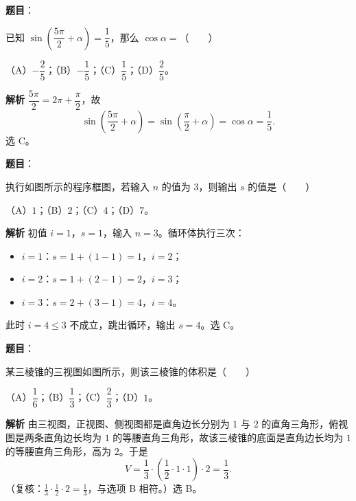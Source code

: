 \begin{answer}

\textbf{题目}：

已知 $\sin\left(\dfrac{5\pi}2+\alpha\right)=\dfrac15$，那么 $\cos\alpha=$\mbox{（　　）}

（A）$-\dfrac25$；（B）$-\dfrac15$；（C）$\dfrac15$；（D）$\dfrac25$。

\textbf{解析}
$\dfrac{5\pi}2=2\pi+\dfrac\pi2$，故
\nopagebreak[4]
\[\sin\left(\frac{5\pi}2+\alpha\right)=\sin\left(\frac\pi2+\alpha\right)=\cos\alpha=\frac15.\]
选 C。


\end{answer}
\begin{answer}

\textbf{题目}：

执行如图所示的程序框图，若输入 $n$ 的值为 $3$，则输出 $s$ 的值是\mbox{（　　）}
\nopagebreak[4]
\begin{center}\end{center}
\nopagebreak[4]
（A）$1$；（B）$2$；（C）$4$；（D）$7$。

\textbf{解析}
初值 $i=1$，$s=1$，输入 $n=3$。循环体执行三次：

\begin{itemize}
\item $i=1$：$s=1+(1-1)=1$，$i=2$；
\item $i=2$：$s=1+(2-1)=2$，$i=3$；
\item $i=3$：$s=2+(3-1)=4$，$i=4$。
\end{itemize}

此时 $i=4\leqslant3$ 不成立，跳出循环，输出 $s=4$。选 C。


\end{answer}
\begin{answer}

\textbf{题目}：

某三棱锥的三视图如图所示，则该三棱锥的体积是\mbox{（　　）}
\nopagebreak[4]
\begin{center}\end{center}
\nopagebreak[4]
（A）$\dfrac16$；（B）$\dfrac13$；（C）$\dfrac23$；（D）$1$。

\textbf{解析}
由三视图，正视图、侧视图都是直角边长分别为 $1$ 与 $2$ 的直角三角形，俯视图是两条直角边长均为 $1$ 的等腰直角三角形，故该三棱锥的底面是直角边长均为 $1$ 的等腰直角三角形，高为 $2$。于是
\nopagebreak[4]
\[V=\frac13\cdot\left(\frac12\cdot1\cdot1\right)\cdot2=\frac13.\]
（复核：$\frac13\cdot\frac12\cdot2=\frac13$，与选项 B 相符。）选 B。


\end{answer}
